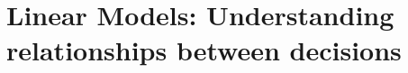 \documentclass{book}
\begin{document}

% 
% 

\tableofcontents

\part{Linear Models: Understanding relationships between decisions}

% 
% 
% 
\end{document}
